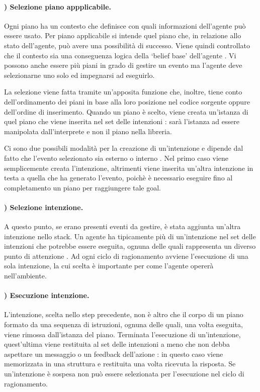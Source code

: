 \paragraph{) Selezione piano appplicabile.}
Ogni piano ha un contesto che definisce con quali informazioni dell'agente può essere usato.
Per piano applicabile si intende quel piano che, in relazione allo stato dell'agente, può avere una possibilità di successo.
Viene quindi controllato che il contesto sia una conseguenza logica della `belief base' dell'agente \cite{JasonAgentSpeak}. Vi possono anche essere più piani in grado di gestire un evento ma l'agente deve selezionarne uno solo ed impegnarsi ad eseguirlo.

La selezione viene fatta tramite un'apposita funzione che, inoltre, tiene conto dell'ordinamento dei piani in base alla loro posizione nel codice sorgente oppure dell'ordine di inserimento. Quando un piano è scelto, viene creata un'istanza di quel piano che viene inserita nel set delle intenzioni \cite{JasonAgentSpeak}: sarà l'istanza ad essere manipolata dall'interprete e non il piano nella libreria.

Ci sono due possibili modalità per la creazione di un'intenzione e dipende dal fatto che l'evento selezionato sia esterno o interno \cite{JasonAgentSpeak}. Nel primo caso viene semplicemente creata l'intenzione, altrimenti viene inserita un'altra intenzione in testa a quella che ha generato l'evento, poichè è necessario eseguire fino al completamento un piano per raggiungere tale goal.

\paragraph{) Selezione intenzione.}
A questo punto, se erano presenti eventi da gestire, è stata aggiunta un'altra intenzione nello stack. Un agente ha tipicamente più di un'intenzione nel set delle intenzioni che potrebbe essere eseguita, ognuna delle quali rappresenta un diverso punto di attenzione \cite{JasonAgentSpeak}. Ad ogni ciclo di ragionamento avviene l'esecuzione di una sola intenzione, la cui scelta è importante per come l'agente opererà nell'ambiente.

\paragraph{) Esecuzione intenzione.}
L'intenzione, scelta nello step precedente, non è altro che il corpo di un piano formato da una sequenza di istruzioni, ognuna delle quali, una volta eseguita, viene rimossa dall'istanza del piano.
Terminata l'esecuzione di un'intenzione, quest'ultima viene restituita al set delle intenzioni a meno che non debba aspettare un messaggio o un feedback dell'azione \cite{JasonAgentSpeak}: in questo caso viene memorizzata in una struttura e restituita una volta ricevuta la risposta.
Se un'intenzione è sospesa non può essere selezionata per l'esecuzione nel ciclo di ragionamento.

